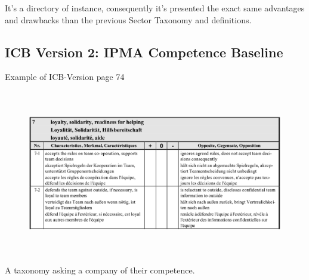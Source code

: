 \documentclass[12pt]{report}
\begin{document}
\vspace{\baselineskip}
It’s a directory of instance, consequently it’s presented the exact same advantages and drawbacks than the previous Sector Taxonomy and definitions.\par


\vspace{\baselineskip}

\vspace{\baselineskip}



\newpage

\vspace{\baselineskip}\subsection*{ICB Version 2: IPMA Competence Baseline}
Example of ICB-Version  page 74 \par




\begin{figure}[H]
	\begin{Center}
		\includegraphics[width=6.3in,height=2.83in]{./media/image11.png}
	\end{Center}
\end{figure}



\par

A taxonomy asking a company of their competence.  \par
\end{document}
